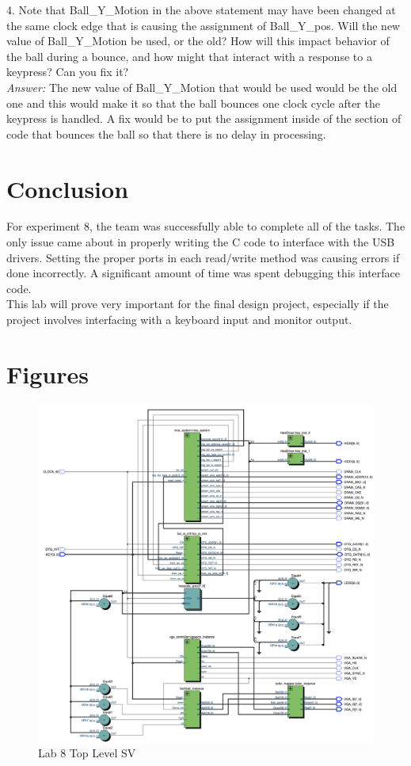 \documentclass[journal, twocolumn, final,11pt,letterpaper]{IEEEtran}
\begin{document}
4.  Note that Ball\_Y\_Motion in the above statement may have been changed at the same clock edge that is causing the assignment of Ball\_Y\_pos.  Will the new value of Ball\_Y\_Motion be used, or the old?  How will this impact behavior of the ball during a bounce, and how might that interact with a response to a keypress?  Can you fix it?\\

\textit{Answer:} The new value of Ball\_Y\_Motion that would be used would be the old one and this would make it so that the ball bounces one clock cycle after the keypress is handled. A fix would be to put the assignment inside of the section of code that bounces the ball so that there is no delay in processing. \\

\section{Conclusion}
For experiment 8, the team was successfully able to complete all of the tasks.  The only issue came about in properly writing the C code to interface with the USB drivers. Setting the proper ports in each read/write method was causing errors if done incorrectly. A significant amount of time was spent debugging this interface code.  \\

This lab will prove very important for the final design project, especially if the project involves interfacing with a keyboard input and monitor output.  


\clearpage
\onecolumn
\section{Figures}

\begin{figure} [H]
	\centering
	\includegraphics[scale=.5]{top_level_diagram.png}
	\caption{Lab 8 Top Level SV\label{fig:top-level}}
\end{figure}
\end{document}
